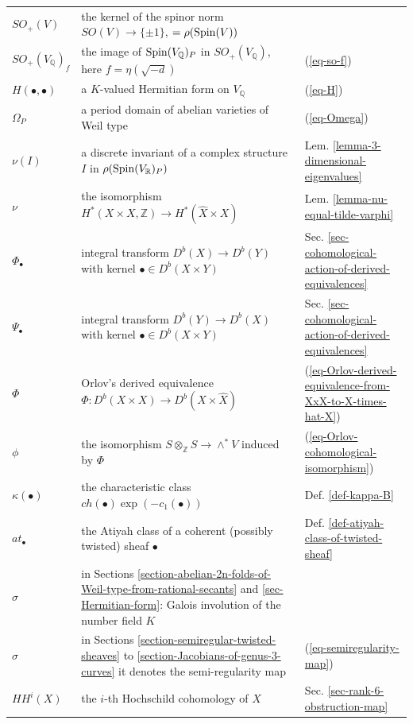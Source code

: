 \documentclass[12pt]{amsart}
\numberwithin{equation}{subsection}
\theoremstyle{plain}
\theoremstyle{definition}
\newcommand{\QQ}{{\mathbb Q}}
\newcommand{\RR}{{\mathbb R}}
\newcommand{\ZZ}{{\mathbb Z}}
\newcommand{\cm}{\eta}
\newcommand{\Spin}{{\rm Spin}}
\begin{document}
\begin{longtable}{l l l}
$SO_+(V)$ & the kernel of the spinor norm $SO(V)\rightarrow \{\pm 1\}$,  $=\rho(\Spin(V))$  & %
\\
$SO_+(V_\QQ)_f$ & the image of $\Spin(V_\QQ)_P$ in $SO_+(V_\QQ)$, here $f=\cm(\sqrt{-d})$ & (\ref{eq-so-f})
\\
$H(\bullet,\bullet)$ & a $K$-valued Hermitian form on $V_\QQ$ & (\ref{eq-H})
\\
$\Omega_P$ & a period domain of abelian varieties of Weil type & (\ref{eq-Omega})
\\
$\nu(I)$ & a discrete invariant of a complex structure $I$ in $\rho(\Spin(V_\RR)_P)$ & Lem. \ref{lemma-3-dimensional-eigenvalues}
\\
$\nu$ & the isomorphism $H^*(X\times X,\ZZ)\rightarrow H^*(\hat{X}\times X)$ & Lem. \ref{lemma-nu-equal-tilde-varphi}
\\
$\Phi_{\bullet}$ & integral transform $D^b(X)\rightarrow D^b(Y)$ with kernel $\bullet\in D^b(X\times Y)$ & Sec. \ref{sec-cohomological-action-of-derived-equivalences}
\\
$\Psi_{\bullet}$ &integral transform $D^b(Y)\rightarrow D^b(X)$ with kernel $\bullet\in D^b(X\times Y)$ & Sec. \ref{sec-cohomological-action-of-derived-equivalences}
\\
$\Phi$ & Orlov's derived equivalence $\Phi:D^b(X\times X)\rightarrow D^b(X\times\hat{X})$ & (\ref{eq-Orlov-derived-equivalence-from-XxX-to-X-times-hat-X})
\\
$\phi$ & the isomorphism $S\otimes_\ZZ S\rightarrow \wedge^*V$ induced by $\Phi$ & (\ref{eq-Orlov-cohomological-isomorphism})
\\
$\kappa(\bullet)$ & the characteristic class $ch(\bullet)\exp(-c_1(\bullet))$ & Def. \ref{def-kappa-B}
\\
$at_\bullet$ & the Atiyah class of a coherent (possibly twisted) sheaf $\bullet$ & Def. \ref{def-atiyah-class-of-twisted-sheaf}
\\
$\sigma$ & in Sections \ref{section-abelian-2n-folds-of-Weil-type-from-rational-secants} and \ref{sec-Hermitian-form}:  Galois involution of the number field $K$ &
\\
$\sigma$ & in Sections \ref{section-semiregular-twisted-sheaves} to \ref{section-Jacobians-of-genus-3-curves} it denotes the semi-regularity map & (\ref{eq-semiregularity-map})
\\
$HH^i(X)$ & the $i$-th Hochschild cohomology of $X$ & Sec. \ref{sec-rank-6-obstruction-map}

\end{longtable}
\end{document}
